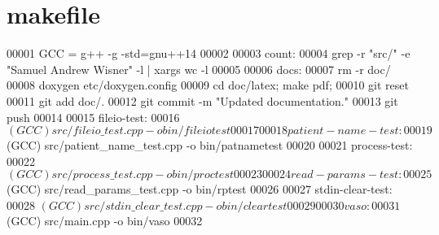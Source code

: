 \hypertarget{makefile_source}{\section{makefile}
}

\begin{DoxyCode}
00001 GCC = g++ -g -std=gnu++14
00002 
00003 count:
00004    grep -r "src/" -e "Samuel Andrew Wisner" -l | xargs wc -l
00005 
00006 docs:
00007    rm -r doc/
00008    doxygen etc/doxygen.config
00009    cd doc/latex; make pdf;
00010    git reset
00011    git add doc/.
00012    git commit -m "Updated documentation."
00013    git push
00014 
00015 fileio-test:
00016    $(GCC) src/fileio\_test.cpp -o bin/fileiotest
00017 
00018 patient-name-test:
00019    $(GCC) src/patient\_name\_test.cpp -o bin/patnametest
00020 
00021 process-test:
00022    $(GCC) src/process\_test.cpp -o bin/proctest
00023 
00024 read-params-test:
00025    $(GCC) src/read\_params\_test.cpp -o bin/rptest
00026 
00027 stdin-clear-test:
00028    $(GCC) src/stdin\_clear\_test.cpp -o bin/cleartest
00029 
00030 vaso:
00031    $(GCC) src/main.cpp -o bin/vaso
00032 
\end{DoxyCode}
